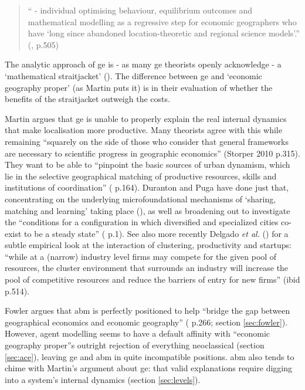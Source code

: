\begin{quote}
`` - individual optimising behaviour, equilibrium outcomes and mathematical modelling as a regressive step for economic geographers who have `long since abandoned location-theoretic and regional science models'.'' (\citealt{overman_can_2004}, p.505)
\end{quote}

The analytic approach of \gls{ge} is - as many \gls{ge} theorists openly acknowledge - a `mathematical straitjacket' (\citealt{martin_new_1999}). The difference between \gls{ge} and `economic geography proper' (as Martin puts it) is in their evaluation of whether the benefits of the straitjacket outweigh the costs. 

Martin argues that \gls{ge} is unable to properly explain the real internal dynamics that make localisation more productive. Many theorists agree with this while remaining ``squarely on the side of those who consider that general frameworks are necessary to scientific progress in geographic economics'' (Storper 2010 p.315). They want to be able to ``pinpoint the basic sources of urban dynamism, which lie in the selective geographical matching of productive resources, skills and institutions of coordination'' (\citealt{storper_rethinking_2009} p.164). Duranton and Puga have done just that, concentrating on the underlying microfoundational mechanisms of `sharing, matching and learning' taking place (\citealt{duranton_micro-foundations_2003}), as well as broadening out to investigate the ``conditions for a configuration in which diversified and specialized cities co-exist to be a steady state'' (\citealt{duranton_nursery_2001} p.1). See also more recently Delgado \emph{et al.} (\citeyear{delgado_clusters_2010}) for a subtle empirical look at the interaction of clustering, productivity and startups: ``while at a (narrow) industry level firms may compete for the given pool of resources, the cluster environment that surrounds an industry will increase the pool of competitive resources and reduce the barriers of entry for new firms'' (ibid p.514). 

Fowler argues that \gls{abm} is perfectly positioned to help ``bridge the gap between geographical economics and economic geography'' (\citealt{fowler_taking_2007} p.266; section \ref{sec:fowler}). However, agent modelling seems to have a default affinity with ``economic geography proper''s outright rejection of everything neoclassical (section \ref{sec:ace}), leaving \gls{ge} and \gls{abm} in quite incompatible positions. \gls{abm} also tends to chime with Martin's argument about \gls{ge}: that valid explanations require digging into a system's internal dynamics (section \ref{sec:levels}).
 
